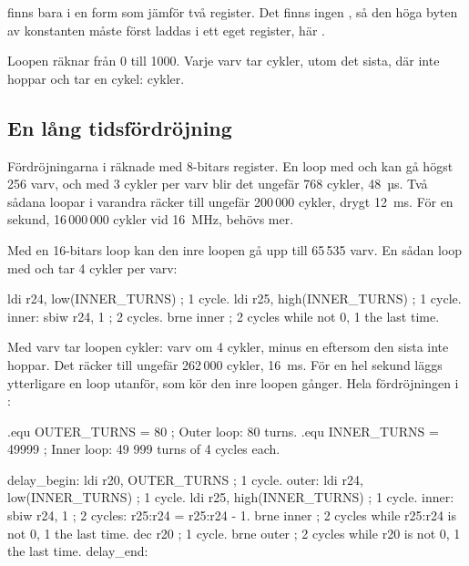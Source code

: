 \noindent{} finns bara i en form som jämför två register. Det finns ingen , så
den höga byten av konstanten måste först laddas i ett eget register, här .

Loopen räknar  från 0 till 1000. Varje varv tar  cykler,
utom det sista, där  inte hoppar och tar en cykel:  cykler.

\subsection{En lång tidsfördröjning}
\label{c10:a10}
Fördröjningarna i  räknade med 8-bitars register. En loop med  och
 kan gå högst 256 varv, och med 3 cykler per varv blir det ungefär 768 cykler, 48~µs.
Två sådana loopar i varandra räcker till ungefär 200\,000 cykler, drygt 12~ms. För en sekund,
16\,000\,000 cykler vid 16~MHz, behövs mer.

Med en 16-bitars loop kan den inre loopen gå upp till 65\,535 varv. En sådan loop med 
och  tar 4 cykler per varv:

\begin{asmcode}
    ldi r24, low(INNER_TURNS)       ; 1 cycle.
    ldi r25, high(INNER_TURNS)      ; 1 cycle.
inner:
    sbiw r24, 1                     ; 2 cycles.
    brne inner                      ; 2 cycles while not 0, 1 the last time.
\end{asmcode}

\noindent Med  varv tar loopen  cykler:  varv om 4 cykler, minus en
eftersom den sista  inte hoppar. Det räcker till ungefär 262\,000 cykler, 16~ms. För en
hel sekund läggs ytterligare en loop utanför, som kör den inre loopen  gånger. Hela
fördröjningen i :

\begin{asmcode}
.equ OUTER_TURNS = 80               ; Outer loop: 80 turns.
.equ INNER_TURNS = 49999            ; Inner loop: 49 999 turns of 4 cycles each.

delay_begin:
    ldi r20, OUTER_TURNS            ; 1 cycle.
outer:
    ldi r24, low(INNER_TURNS)       ; 1 cycle.
    ldi r25, high(INNER_TURNS)      ; 1 cycle.
inner:
    sbiw r24, 1                     ; 2 cycles: r25:r24 = r25:r24 - 1.
    brne inner                      ; 2 cycles while r25:r24 is not 0, 1 the last time.
    dec r20                         ; 1 cycle.
    brne outer                      ; 2 cycles while r20 is not 0, 1 the last time.
delay_end:
\end{asmcode}

